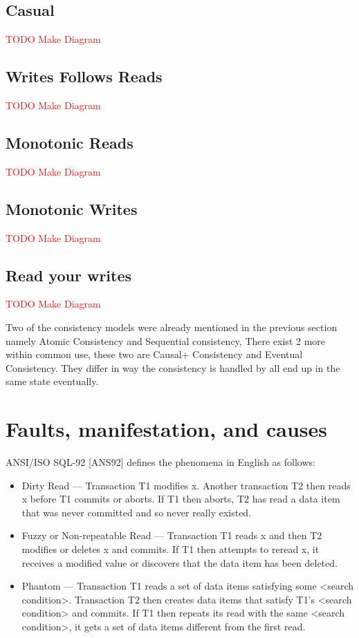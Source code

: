 \documentclass[a4paper,10pt,titlepage]{report}
\begin{document}
\subsection{Casual}
\textcolor{red}{TODO Make Diagram}
\subsection{Writes Follows Reads}
\textcolor{red}{TODO Make Diagram}
\subsection{Monotonic Reads}
\textcolor{red}{TODO Make Diagram}
\subsection{Monotonic Writes}
\textcolor{red}{TODO Make Diagram}
\subsection{Read your writes}
\textcolor{red}{TODO Make Diagram}

Two of the consistency models were already mentioned in the previous section namely Atomic Consistency and Sequential consistency, There exist 2 more within common use, these two are Causal+ Consistency and  Eventual Consistency. They differ in way the consistency is handled by all end up in the same state eventually.





\newpage
\section{Faults, manifestation, and causes}


ANSI/ISO SQL-92 [ANS92] defines the phenomena in English as follows:
\begin{itemize}

\item Dirty Read — Transaction T1 modifies x. Another transaction T2 then reads x before T1 commits or aborts. If T1 then aborts, T2 has read a data item that was never committed and so never really existed.

\item Fuzzy or Non-repeatable Read — Transaction T1 reads x and then T2 modifies or deletes x and commits. If T1 then attempts to reread x, it receives a modified value or discovers that the data item has been deleted.
\item Phantom — Transaction T1 reads a set of data items satisfying some <search condition>. Transaction T2 then creates data items that satisfy T1's <search condition> and commits. If T1 then repeats its read with the same <search condition>, it gets a set of data items different from the first read.
\end{itemize}
\end{document}
